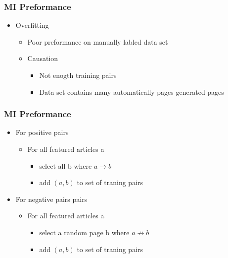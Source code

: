 \begin{frame}
    \frametitle{MI Preformance}
    \begin{itemize}
      \item Overfitting
      \begin{itemize}
        \item Poor preformance on manually labled data set
        \item Causation
        \begin{itemize}
          \item Not enogth training pairs
          \item Data set contains many automatically pages generated pages
        \end{itemize}
      \end{itemize}
    \end{itemize}
\end{frame}


\begin{frame}
    \frametitle{MI Preformance}
    \begin{itemize}
      \item For positive pairs
      \begin{itemize}
        \item For all featured articles a
        \begin{itemize}
          \item select all b where $a \rightarrow b$
          \item add $(a,b)$ to set of traning pairs
        \end{itemize}
      \end{itemize}
      \item For negative pairs pairs
      \begin{itemize}
        \item For all featured articles a
        \begin{itemize}
          \item select a random page b where $a \not \rightarrow b$
          \item add $(a,b)$ to set of traning pairs
        \end{itemize}
      \end{itemize}
    \end{itemize}
\end{frame}


